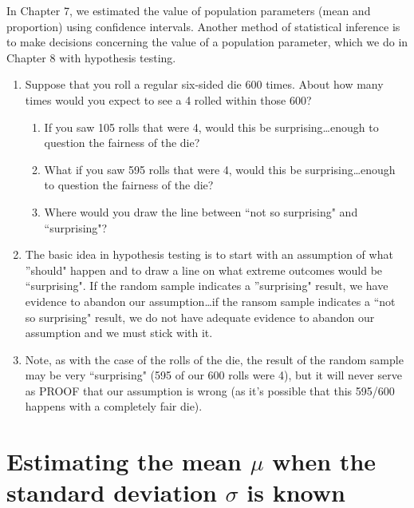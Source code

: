 \documentclass{ccg-topic}
\begin{document}
In Chapter 7, we estimated the value of population parameters (mean and proportion) using confidence intervals. Another method of statistical inference is to make decisions concerning the value of a population parameter, which we do in Chapter 8 with hypothesis testing.

\begin{enumerate}

  \item Suppose that you roll a regular six-sided die 600 times. About how many times would you expect to see a 4 rolled within those 600?
    
    \begin{enumerate}
    
      \item If you saw 105 rolls that were 4, would this be surprising\ldots enough to question the fairness of the die?

      \item What if you saw 595 rolls that were 4, would this be surprising\ldots enough to question the fairness of the die?

      \item Where would you draw the line between ``not so surprising" and ``surprising"?
      
    \end{enumerate}
    
  \item The basic idea in hypothesis testing is to start with an assumption of what ''should" happen and to draw a line on what extreme outcomes would be ``surprising". If the random sample indicates a ''surprising" result, we have evidence to abandon our assumption\ldots if the ransom sample indicates a ``not so surprising" result, we do not have adequate evidence to abandon our assumption and we must stick with it.
  
  \item Note, as with the case of the rolls of the die, the result of the random sample may be very ``surprising" (595 of our 600 rolls were 4), but it will never serve as PROOF that our assumption is wrong (as it's possible that this 595/600 happens with a completely fair die).
  
\end{enumerate}

\newpage
\section{Estimating the mean $\mu$ when the standard deviation $\sigma$ is known}

\end{document}
